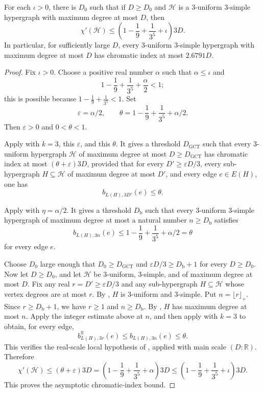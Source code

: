 \begin{theorem}
For each $\iota>0$, there is $D_0$ such that if $D\ge D_0$ and
$\mathcal H$ is a $3$-uniform $3$-simple hypergraph with maximum degree at
most $D$, then
\[
\chi'(\mathcal H)\le
\left(1-\frac19+\frac{1}{3^5}+\iota\right)3D.
\]
In particular, for sufficiently large $D$, every $3$-uniform $3$-simple
hypergraph with maximum degree at most $D$ has chromatic index at most
$2.6791D$.
\end{theorem}
\begin{proof}
Fix $\iota>0$.  Choose a positive real number $\alpha$ such that
$\alpha\le\iota$ and
\[
1-\frac19+\frac1{3^5}+\frac{\alpha}{2}<1;
\]
this is possible because $1-\frac19+\frac1{3^5}<1$.  Set
\[
\varepsilon=\alpha/2,\qquad
\theta=1-\frac19+\frac1{3^5}+\alpha/2 .
\]
Then $\varepsilon>0$ and $0<\theta<1$.

Apply  with $k=3$, this $\varepsilon$, and
this $\theta$.  It gives a threshold $D_{\mathrm{GCT}}$ such that every
$3$-uniform hypergraph $\mathcal H$ of maximum degree at most $D\ge
D_{\mathrm{GCT}}$ has chromatic index at most $(\theta+\varepsilon)3D$,
provided that for every $D'\ge\varepsilon D/3$, every sub-hypergraph
$H\subseteq\mathcal H$ of maximum degree at most $D'$, and every edge
$e\in E(H)$, one has
\[
b_{L(H),3D'}(e)\le\theta .
\]

Apply  with
$\eta=\alpha/2$.  It gives a threshold $D_{\mathrm b}$ such that every
$3$-uniform $3$-simple hypergraph of maximum degree at most a natural
number $n\ge D_{\mathrm b}$ satisfies
\[
b_{L(H),3n}(e)\le
1-\frac19+\frac1{3^5}+\alpha/2=\theta
\]
for every edge $e$.

Choose $D_0$ large enough that $D_0\ge D_{\mathrm{GCT}}$ and
$\varepsilon D/3\ge D_{\mathrm b}+1$ for every $D\ge D_0$.  Now let
$D\ge D_0$, and let $\mathcal H$ be $3$-uniform, $3$-simple, and of maximum
degree at most $D$.  Fix any real $r=D'\ge\varepsilon D/3$ and any
sub-hypergraph $H\subseteq\mathcal H$ whose vertex degrees are at most $r$.
By , $H$ is $3$-uniform and $3$-simple.
Put $n=\lfloor r\rfloor_+$.  Since $r\ge D_{\mathrm b}+1$, we have
$r\ge1$ and $n\ge D_{\mathrm b}$.
By , $H$ has maximum degree at most $n$.
Apply the integer estimate above at $n$, and then apply
 with $k=3$ to obtain, for every edge,
\[
b^{\mathbb R}_{L(H),3r}(e)\le b_{L(H),3n}(e)\le\theta.
\]
This verifies the real-scale local hypothesis of
, applied with main scale $(D:\mathbb R)$.
Therefore
\[
\chi'(\mathcal H)\le(\theta+\varepsilon)3D
=\left(1-\frac19+\frac1{3^5}+\alpha\right)3D
\le
\left(1-\frac19+\frac1{3^5}+\iota\right)3D.
\]
This proves the asymptotic chromatic-index bound.


\end{proof}
